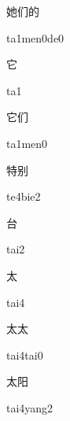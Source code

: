 \begin{verbete}[ta1men0de0]{她们的}
\begin{pronuncia}{ta1men0de0}
\end{pronuncia}
\end{verbete}

\begin{verbete}[ta1]{它}
\begin{pronuncia}{ta1}
\end{pronuncia}
\end{verbete}

\begin{verbete}[ta1men0]{它们}
\begin{pronuncia}{ta1men0}
\end{pronuncia}
\end{verbete}

\begin{verbete}[te4bie2]{特别}
\begin{pronuncia}{te4bie2}
\end{pronuncia}
\end{verbete}

\begin{verbete}[tai2]{台}
\begin{pronuncia}{tai2}
\end{pronuncia}
\end{verbete}

\begin{verbete}[tai4]{太}
\begin{pronuncia}{tai4}
\end{pronuncia}
\end{verbete}

\begin{verbete}{太太}
\begin{pronuncia}{tai4tai0}
\end{pronuncia}
\end{verbete}

\begin{verbete}{太阳}
\begin{pronuncia}{tai4yang2}
\end{pronuncia}
\end{verbete}

